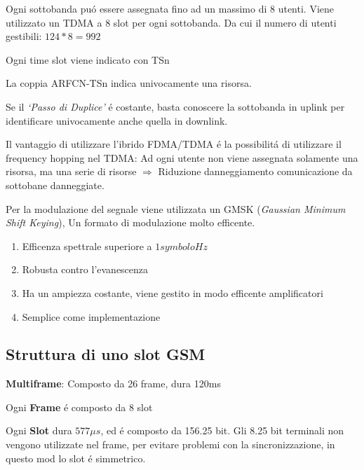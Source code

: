 \documentclass{article}
\begin{document}
Ogni sottobanda pu\'o essere assegnata fino ad un massimo di 8 utenti. Viene utilizzato un TDMA a 8 slot per ogni sottobanda. Da cui il numero di utenti gestibili: $124*8 = 992$

Ogni time slot viene indicato con TSn

La coppia ARFCN-TSn indica univocamente una risorsa.

Se il \textit{`Passo di Duplice'} \'e costante, basta conoscere la sottobanda in uplink per identificare univocamente anche quella in downlink.

Il vantaggio di utilizzare l'ibrido FDMA/TDMA \'e la possibilit\'a di utilizzare il frequency hopping nel TDMA: Ad ogni utente non viene assegnata solamente una risorsa, ma una serie di risorse $\Rightarrow$ Riduzione danneggiamento comunicazione da sottobane danneggiate.

Per la modulazione del segnale viene utilizzata un GMSK (\textit{Gaussian Minimum Shift Keying}), Un formato di modulazione molto efficente.
\begin{enumerate}
    \item Efficenza spettrale superiore a $1 \textit{symbolo}{Hz}$
    \item Robusta contro l'evanescenza
    \item Ha un ampiezza costante, viene gestito in modo efficente amplificatori
    \item Semplice come implementazione
\end{enumerate}

\subsection{Struttura di uno slot GSM}
\begin{center}
\end{center}

\textbf{Multiframe}: Composto da 26 frame, dura 120ms

Ogni \textbf{Frame} \'e composto da 8 slot

Ogni \textbf{Slot} dura $577\mu s$, ed \'e composto da 156.25 bit. Gli 8.25 bit terminali non vengono utilizzate nel frame, per evitare problemi con la sincronizzazione, in questo mod lo slot \'e simmetrico.
\end{document}
